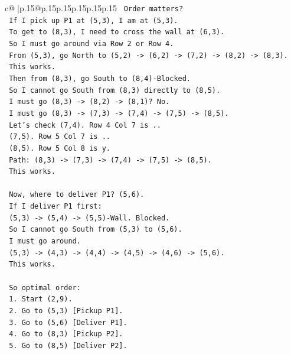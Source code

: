 \documentclass{article}
\begin{document}
{\begin{supertabular}{c@{$\;$}|p{.15\linewidth}@{}p{.15\linewidth}p{.15\linewidth}p{.15\linewidth}p{.15\linewidth}p{.15\linewidth}}
{{{\texttt{   Order matters?} \\
\texttt{   If I pick up P1 at (5,3), I am at (5,3).} \\
\texttt{   To get to (8,3), I need to cross the wall at (6,3).} \\
\texttt{   So I must go around via Row 2 or Row 4.} \\
\texttt{   From (5,3), go North to (5,2) {-}> (6,2) {-}> (7,2) {-}> (8,2) {-}> (8,3).} \\
\texttt{   This works.} \\
\texttt{   Then from (8,3), go South to (8,4){-}Blocked.} \\
\texttt{   So I cannot go South from (8,3) directly to (8,5).} \\
\texttt{   I must go (8,3) {-}> (8,2) {-}> (8,1)? No.} \\
\texttt{   I must go (8,3) {-}> (7,3) {-}> (7,4) {-}> (7,5) {-}> (8,5).} \\
\texttt{   Let's check (7,4). Row 4 Col 7 is ..} \\
\texttt{   (7,5). Row 5 Col 7 is ..} \\
\texttt{   (8,5). Row 5 Col 8 is y.} \\
\texttt{   Path: (8,3) {-}> (7,3) {-}> (7,4) {-}> (7,5) {-}> (8,5).} \\
\texttt{   This works.} \\
\\ 
\texttt{   Now, where to deliver P1? (5,6).} \\
\texttt{   If I deliver P1 first:} \\
\texttt{   (5,3) {-}> (5,4) {-}> (5,5){-}Wall. Blocked.} \\
\texttt{   So I cannot go South from (5,3) to (5,6).} \\
\texttt{   I must go around.} \\
\texttt{   (5,3) {-}> (4,3) {-}> (4,4) {-}> (4,5) {-}> (4,6) {-}> (5,6).} \\
\texttt{   This works.} \\
\\ 
\texttt{   So optimal order:} \\
\texttt{   1. Start (2,9).} \\
\texttt{   2. Go to (5,3) {[}Pickup P1{]}.} \\
\texttt{   3. Go to (5,6) {[}Deliver P1{]}.} \\
\texttt{   4. Go to (8,3) {[}Pickup P2{]}.} \\
\texttt{   5. Go to (8,5) {[}Deliver P2{]}.} \\
}}}
\end{supertabular}}
\end{document}
